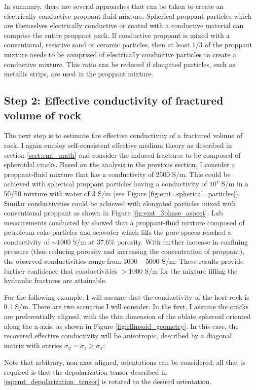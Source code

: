 

In summary, there are several approaches that can be taken to create an electrically conductive proppant-fluid mixture. Spherical proppant particles which are themselves electrically conductive or coated with a conductive material can comprise the entire proppant pack. If conductive proppant is mixed with a conventional, resistive sand or ceramic particles, then at least 1/3 of the proppant mixture needs to be comprised of electrically conductive particles to create a conductive mixture. This ratio can be reduced if elongated particles, such as metallic strips, are used in the proppant mixture.

\subsection{Step 2: Effective conductivity of fractured volume of rock}
\label{sec:emt-rock-volume}
The next step is to estimate the effective conductivity of a fractured volume of rock. I again employ self-consistent effective medium theory as described in section \ref{sect:emt_math} and consider the induced fractures to be composed of spheroidal cracks. Based on the analysis in the previous section, I consider a proppant-fluid mixture that has a conductivity of 2500 S/m. This could be achieved with spherical proppant particles having a conductivity of $10^4$ S/m in a 50/50 mixture with water of 3 S/m (see Figure \ref{fig:emt_spherical_particles}). Similar conductivities could be achieved with elongated particles mixed with conventional proppant as shown in Figure \ref{fig:emt_3phase_aspect}. Lab measurements conducted by \cite{Zhang2016} showed that a proppant-fluid mixture composed of petroleum coke particles and seawater which fills the pore-spaces reached a conductivity of $\sim 1000$ S/m at 37.6\% porosity. With further increase in confining pressure (thus reducing porosity and increasing the concentration of proppant), the observed conductivities range from  $3000 - 5000$ S/m. These results provide further confidence that conductivities $> 1000$ S/m for the mixture filling the hydraulic fractures are attainable.


For the following example, I will assume that the conductivity of the host-rock is 0.1 S/m. There are two scenarios I will consider. In the first, I assume the cracks are preferentially aligned, with the thin dimension of the oblate spheroid oriented along the x-axis, as shown in Figure \ref{fig:ellipsoid_geometry}. In this case, the recovered effective conductivity will be anisotropic, described by a diagonal matrix with entries $\sigma_y = \sigma_z \geq \sigma_x:$

Note that arbitrary, non-axes aligned, orientations can be considered; all that is required is that the depolarization tensor described in \ref{eq:emt_depolarization_tensor} is rotated to the desired orientation.


